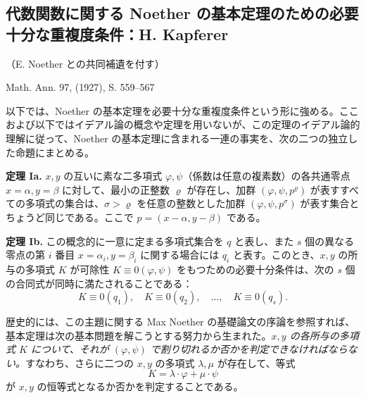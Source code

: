 \clearpage
\subsection*{代数関数に関する Noether の基本定理のための必要十分な重複度条件：H. Kapferer}\label{notwendige-und-hinreichende-multiplizitaetsbedingungen-zum-noetherschen-fundamentalsatz-der-algebraischen-funktionen}

\begin{center}
（E. Noether との共同補遺を付す）

Math. Ann. 97, (1927), S. 559--567
\end{center}

以下では、Noether の基本定理を必要十分な重複度条件という形に強める。ここおよび以下ではイデアル論の概念や定理を用いないが、この定理のイデアル論的理解に従って、Noether の基本定理に含まれる一連の事実を、次の二つの独立した命題にまとめる。

\textbf{定理 Ia.} \(x,y\) の互いに素な二多項式 \(\varphi,\psi\)（係数は任意の複素数）の各共通零点 \(x=\alpha, y=\beta\) に対して、最小の正整数 \(\varrho\) が存在し、加群 \((\varphi,\psi,p^\varrho)\) が表すすべての多項式の集合は、\(\sigma>\varrho\) を任意の整数とした加群 \((\varphi,\psi,p^\sigma)\) が表す集合とちょうど同じである。ここで \(p=(x-\alpha,y-\beta)\) である。

\textbf{定理 Ib.} この概念的に一意に定まる多項式集合を \(q\) と表し、また \(s\) 個の異なる零点の第 \(i\) 番目 \(x=\alpha_i, y=\beta_i\) に関する場合には \(q_i\) と表す。このとき、\(x,y\) の所与の多項式 \(K\) が可除性 \(K\equiv0(\varphi,\psi)\) をもつための必要十分条件は、次の \(s\) 個の合同式が同時に満たされることである：
\[
K\equiv0(q_1),\quad K\equiv0(q_2),\quad\ldots,\quad K\equiv0(q_s).
\]

歴史的には、この主題に関する Max Noether の基礎論文の序論を参照すれば、基本定理は次の基本問題を解こうとする努力から生まれた。\emph{\(x,y\) の各所与の多項式 \(K\) について、それが \((\varphi,\psi)\) で割り切れるか否かを判定できなければならない。}すなわち、さらに二つの \(x,y\) の多項式 \(\lambda,\mu\) が存在して、等式
\[
K=\lambda\cdot\varphi+\mu\cdot\psi
\]
が \(x,y\) の恒等式となるか否かを判定することである。


